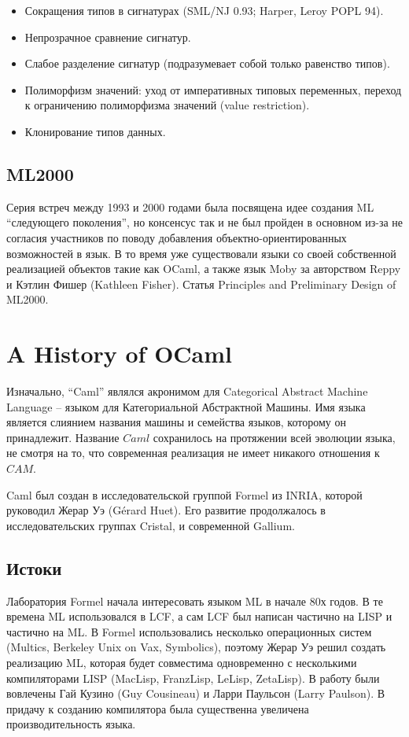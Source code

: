 \documentclass[14pt]{matmex-diploma-custom}
\begin{document}
\begin{itemize}
\item Сокращения типов в сигнатурах (SML/NJ 0.93; Harper, Leroy POPL 94).
\item Непрозрачное сравнение сигнатур.
\item Слабое разделение сигнатур (подразумевает собой только равенство типов).
\item Полиморфизм значений: уход от императивных типовых переменных, переход к ограничению полиморфизма значений (value restriction).
\item Клонирование типов данных.
\end{itemize}

\subsection{ML2000}
Серия встреч между 1993 и 2000 годами была посвящена идее создания ML “следующего поколения”, но консенсус так и не был пройден в основном из-за не согласия участников по поводу добавления объектно-ориентированных возможностей в язык. В то время уже существовали языки со своей собственной реализацией объектов такие как OCaml, а также язык Moby за авторством Reppy и Кэтлин Фишер (Kathleen Fisher). 
Статья Principles and Preliminary Design of ML2000. 


\section{A History of OCaml}
Изначально, “Caml” являлся акронимом для Categorical Abstract Machine Language -- языком для Категориальной Абстрактной Машины. Имя языка является слиянием названия машины и семейства языков, которому он принадлежит. Название $Caml$ сохранилось на протяжении всей эволюции языка, не смотря на то, что современная реализация не имеет никакого отношения к $CAM$.

Caml был создан в исследовательской группой Formel из INRIA, которой руководил Жерар Уэ (Gérard Huet). Его развитие продолжалось в исследовательских группах Cristal, и современной Gallium.

\subsection{Истоки}
Лаборатория Formel начала интересовать языком ML в начале 80х годов. В те времена ML использовался в LCF, а сам LCF был написан частично на LISP и частично на ML. В Formel использовались несколько операционных систем (Multics, Berkeley Unix on Vax, Symbolics), поэтому Жерар Уэ решил создать реализацию ML, которая будет совместима одновременно с несколькими компиляторами LISP  (MacLisp, FranzLisp, LeLisp, ZetaLisp). В работу были вовлечены Гай Кузино (Guy Cousineau) и Ларри Паульсон (Larry Paulson). В придачу к созданию компилятора была существенна увеличена производительность языка.
\end{document}
